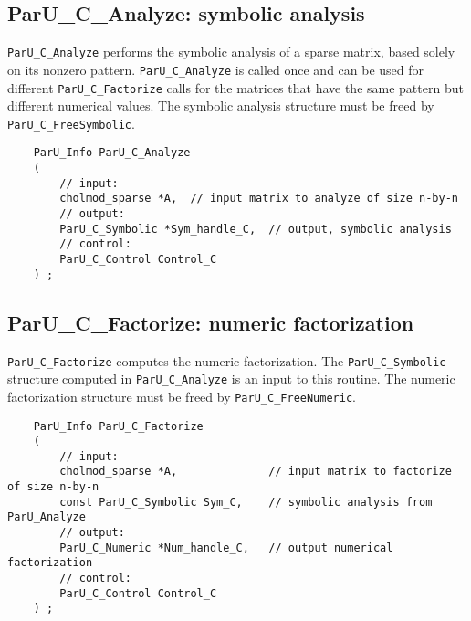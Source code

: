 \documentclass[12pt]{article}
\begin{document}
\subsection{{\sf ParU\_C\_Analyze}: symbolic analysis}

    \verb'ParU_C_Analyze' performs the symbolic analysis of a sparse
        matrix, based solely on its nonzero pattern.  \verb'ParU_C_Analyze' is
        called once and can be used for different \verb'ParU_C_Factorize' calls
        for the matrices that have the same pattern but different numerical
        values.  The symbolic analysis structure must be freed by
        \verb'ParU_C_FreeSymbolic'.

    {\footnotesize
    \begin{verbatim}
    ParU_Info ParU_C_Analyze
    (
        // input:
        cholmod_sparse *A,  // input matrix to analyze of size n-by-n
        // output:
        ParU_C_Symbolic *Sym_handle_C,  // output, symbolic analysis
        // control:
        ParU_C_Control Control_C
    ) ; \end{verbatim} }

\subsection{{\sf ParU\_C\_Factorize}: numeric factorization}

    \verb'ParU_C_Factorize' computes the numeric factorization.  The
    \verb'ParU_C_Symbolic' structure computed in \verb'ParU_C_Analyze' is an
    input to this routine.  The numeric factorization structure must be freed
    by \verb'ParU_C_FreeNumeric'.

    {\footnotesize
    \begin{verbatim}
    ParU_Info ParU_C_Factorize
    (
        // input:
        cholmod_sparse *A,              // input matrix to factorize of size n-by-n
        const ParU_C_Symbolic Sym_C,    // symbolic analysis from ParU_Analyze
        // output:
        ParU_C_Numeric *Num_handle_C,   // output numerical factorization
        // control:
        ParU_C_Control Control_C
    ) ; \end{verbatim} }

\end{document}
